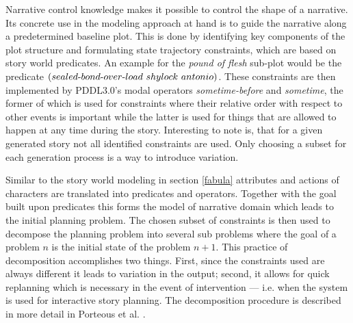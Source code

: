 Narrative control knowledge makes it possible to control the shape of a narrative. Its concrete use in the modeling approach at hand is to guide the narrative along a predetermined baseline plot. This is done by identifying key components of the plot structure and formulating state trajectory constraints, which are based on story world predicates. An example for the \emph{pound of flesh} sub-plot would be the predicate $(sealed\h bond\h over\h load\ shylock\ antonio)$. These constraints are then implemented by PDDL3.0's \cite{Gerevini09} modal operators \emph{some\-time-before} and \emph{sometime}, the former of which is used for constraints where their relative order with respect to other events is important while the latter is used for things that are allowed to happen at any time during the story. Interesting to note is, that for a given generated story not all identified constraints are used. Only choosing a subset for each generation process is a way to introduce variation.

Similar to the story world modeling in section \ref{fabula} attributes and actions of characters are translated into predicates and operators. Together with the goal built upon predicates this forms the model of narrative domain which leads to the initial planning problem. The chosen subset of constraints is then used to decompose the planning problem into several sub problems where the goal of a problem $n$ is the initial state of the problem $n+1$. This practice of decomposition accomplishes two things. First, since the constraints used are always different it leads to variation in the output; second, it allows for quick replanning which is necessary in the event of intervention --- i.e. when the system is used for interactive story planning. The decomposition procedure is described in more detail in Porteous et al. \cite{Porteous10}.

